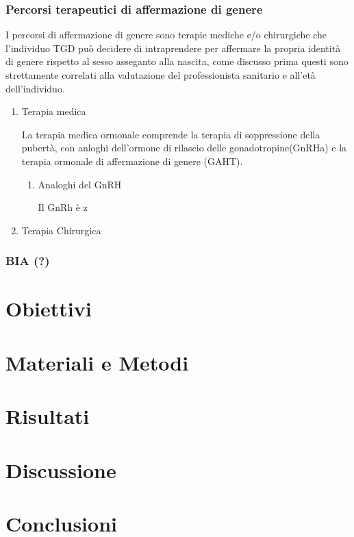 \documentclass[11pt]{article}
\begin{document}
\subsubsection{Percorsi terapeutici di affermazione di genere}
\label{sec:orgf729db1}
I percorsi di affermazione di genere sono terapie mediche e/o chirurgiche che l'individuo TGD può decidere di intraprendere per affermare la propria identità di genere rispetto al sesso asseganto alla nascita, come discusso prima questi sono strettamente correlati alla valutazione del professionista sanitario e all'età dell'individuo.
\begin{enumerate}
\item Terapia medica
\label{sec:orgb89e3ec}

La terapia medica ormonale comprende la terapia di soppressione della pubertà, con anloghi dell'ormone di rilascio delle gonadotropine(GnRHa) e la terapia ormonale di affermazione di genere (GAHT).
\begin{enumerate}
\item Analoghi del GnRH
\label{sec:orgf05ca48}

Il GnRh è z
\end{enumerate}
\item Terapia Chirurgica
\label{sec:orgdb0aad7}
\end{enumerate}
\subsubsection{BIA (?)}
\label{sec:org3f9cc6d}
\section{Obiettivi}
\label{sec:orgcd57b19}

\section{Materiali e Metodi}
\label{sec:org1f42911}

\section{Risultati}
\label{sec:org2b17b51}

\section{Discussione}
\label{sec:orgcb72834}

\section{Conclusioni}
\label{sec:orgd2848ca}
\end{document}
